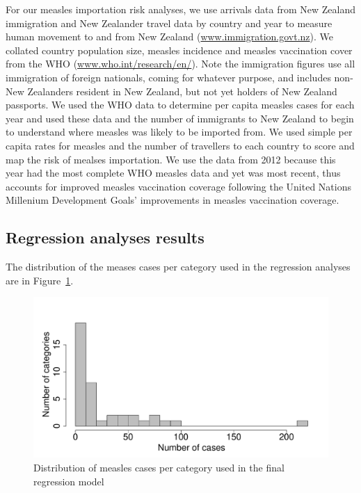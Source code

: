 \documentclass{article}
\begin{document}
\begin{itemize}
For our measles importation risk analyses, we use arrivals data from New Zealand immigration and New Zealander travel data by country and year to measure human movement to and from New Zealand  (\href{http://www.immigration.govt.nz/}{www.immigration.govt.nz}). We collated country population size, measles incidence and measles vaccination cover from the WHO (\href{http://www.who.int/research/en/}{www.who.int/research/en/}). Note the immigration figures use all immigration of foreign nationals, coming for whatever purpose, and includes non-New Zealanders resident in New Zealand, but not yet holders of New Zealand passports. We used the WHO data to determine per capita measles cases for each year and used these data and the number of immigrants to New Zealand to begin to understand where measles was likely to be imported from. We used simple per capita rates for measles and the number of travellers to each country to score and map the risk of mealses importation. We use the data from 2012 because this year had the most complete WHO measles data and yet was most recent, thus accounts for improved measles vaccination coverage following the United Nations Millenium Development Goals' improvements in measles vaccination coverage. 


\subsection{Regression analyses results}
\label{sub:regression_results}

The distribution of the meases cases per category used in the regression analyses are in Figure~\ref{fig:histcasecat}.
\begin{figure}
\begin{center}
\includegraphics{draftfinalreport-014}
\end{center}
\caption{Distribution of measles cases per category used in the final regression model}
\label{fig:histcasecat}
\end{figure}


\end{itemize}
\end{document}
